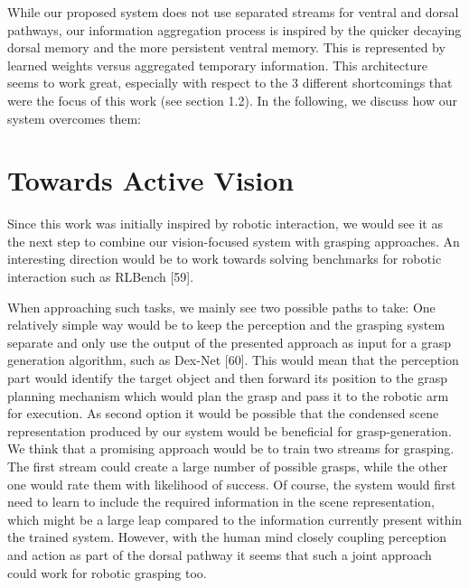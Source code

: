 While our proposed system does not use separated streams for ventral and dorsal pathways, our information
aggregation process is inspired by the quicker decaying dorsal memory and the more persistent
ventral memory. This is represented by learned weights versus aggregated temporary information. This
architecture seems to work great, especially with respect to the 3 diﬀerent shortcomings that were the
focus of this work (see section 1.2). In the following, we discuss how our system overcomes them:
\section{Towards Active Vision}
Since this work was initially inspired by robotic interaction, we would see it as the next step to combine
our vision-focused system with grasping approaches. An interesting direction would be to work towards
solving benchmarks for robotic interaction such as RLBench [59].

When approaching such tasks, we mainly see two possible paths to take: One relatively simple way
would be to keep the perception and the grasping system separate and only use the output of the
presented approach as input for a grasp generation algorithm, such as Dex-Net [60]. This would mean
that the perception part would identify the target object and then forward its position to the grasp
planning mechanism which would plan the grasp and pass it to the robotic arm for execution. As
second option it would be possible that the condensed scene representation produced by our system
would be beneﬁcial for grasp-generation. We think that a promising approach would be to train two
streams for grasping. The ﬁrst stream could create a large number of possible grasps, while the other
one would rate them with likelihood of success. Of course, the system would ﬁrst need to learn to
include the required information in the scene representation, which might be a large leap compared to
the information currently present within the trained system. However, with the human mind closely
coupling perception and action as part of the dorsal pathway it seems that such a joint approach could
work for robotic grasping too.
